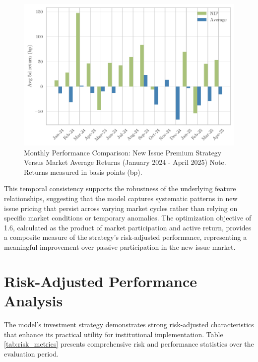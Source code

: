 \begin{figure}[h]
    \begin{center}
        \includegraphics[width=\textwidth]{images/monthly_comparison.pdf}
    \end{center}
    \caption{Monthly Performance Comparison: New Issue Premium Strategy Versus Market Average Returns (January 2024 - April 2025) Note. Returns measured in basis points (bp).}
    \label{fig:monthly_performance}
\end{figure}

This temporal consistency supports the robustness of the underlying feature relationships, suggesting that the model captures systematic patterns in new issue pricing that persist across varying market cycles rather than relying on specific market conditions or temporary anomalies. The optimization objective of 1.6, calculated as the product of market participation and active return, provides a composite measure of the strategy's risk-adjusted performance, representing a meaningful improvement over passive participation in the new issue market.

\section{Risk-Adjusted Performance Analysis}

The model's investment strategy demonstrates strong risk-adjusted characteristics that enhance its practical utility for institutional implementation. Table \ref{tab:risk_metrics} presents comprehensive risk and performance statistics over the evaluation period.

